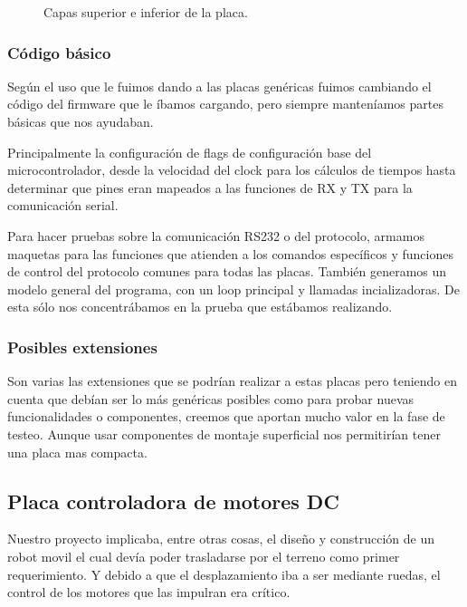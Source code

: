 \begin{figure}
	\caption{Capas superior e inferior de la placa.}
	\label{hF_placa_gen_capas}
\end{figure}

\subsubsection{C\'odigo b\'asico}
\label{h_placas_generica_codigo}

Seg\'un el uso que le fuimos dando a las placas gen\'ericas fuimos cambiando el c\'odigo del firmware que le
\'ibamos cargando, pero siempre manten\'iamos partes b\'asicas que nos ayudaban.

Principalmente la configuraci\'on de flags de configuraci\'on base del microcontrolador, desde la velocidad
del clock para los c\'alculos de tiempos hasta determinar que pines eran mapeados a las funciones de RX y TX
para la comunicaci\'on serial.

Para hacer pruebas sobre la comunicaci\'on RS232 o del protocolo, armamos maquetas para las funciones que
atienden a los comandos espec\'ificos y funciones de control del protocolo comunes para todas las placas.
Tambi\'en generamos un modelo general del programa, con un loop principal y llamadas incializadoras.
De esta s\'olo nos concentr\'abamos en la prueba que est\'abamos realizando.

\subsubsection{Posibles extensiones}
\label{h_placas_generica_extensiones}

Son varias las extensiones que se podr\'ian realizar a estas placas pero teniendo en cuenta que deb\'ian ser
lo m\'as gen\'ericas posibles como para probar nuevas funcionalidades o componentes, creemos que aportan mucho
valor en la fase de testeo.
Aunque usar componentes de montaje superficial nos permitir\'ian tener una placa mas compacta.

\subsection{Placa controladora de motores DC}
\label{h_placas_motorDC}

Nuestro proyecto implicaba, entre otras cosas, el dise\~no y construcci\'on de un robot movil el cual dev\'ia poder
trasladarse por el terreno como primer requerimiento.
Y debido a que el desplazamiento iba a ser mediante ruedas, el control de los motores que las impulran era cr\'itico.

